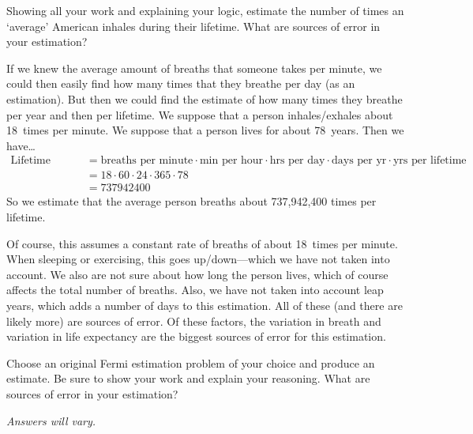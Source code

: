 \documentclass[11pt,letterpaper]{article}
\begin{document}
\newpage



 Showing all your work and explaining your logic, estimate the number of times an `average' American inhales during their lifetime. What are sources of error in your estimation? \pspace

\sol If we knew the average amount of breaths that someone takes per minute, we could then easily find how many times that they breathe per day (as an estimation). But then we could find the estimate of how many times they breathe per year and then per lifetime. We suppose that a person inhales/exhales about 18~times per minute. We suppose that a person lives for about 78~years. Then we have\dots
	\[
	\begin{aligned}
	\text{Lifetime breaths}&= \text{breaths per minute} \cdot \text{min per hour} \cdot \text{hrs per day} \cdot \text{days per yr} \cdot \text{yrs per lifetime} \\[0.3cm]
	&= 18 \cdot 60 \cdot 24 \cdot 365 \cdot 78 \\[0.3cm]
	&= 737942400
	\end{aligned}
	\]
So we estimate that the average person breaths about 737,942,400 times per lifetime. \pspace

Of course, this assumes a constant rate of breaths of about 18~times per minute. When sleeping or exercising, this goes up/down---which we have not taken into account. We also are not sure about how long the person lives, which of course affects the total number of breaths. Also, we have not taken into account leap years, which adds a number of days to this estimation. All of these (and there are likely more) are sources of error. Of these factors, the variation in breath and variation in life expectancy are the biggest sources of error for this estimation. 



\newpage



 Choose an original Fermi estimation problem of your choice and produce an estimate. Be sure to show your work and explain your reasoning. What are sources of error in your estimation? \pspace

\vfill
\begin{center}
{\itshape Answers will vary.}
\end{center}
\vfill
\end{document}
